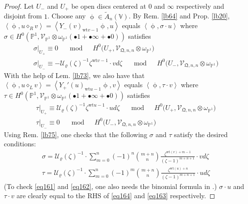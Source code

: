 \documentclass[11pt,b5paper,notitlepage]{article}
\theoremstyle{definition}
\theoremstyle{plain}
\newcommand{\mc}{\mathcal}
\newcommand{\wtd}{\widetilde}
\newcommand{\scr}{\mathscr}
\newcommand{\blt}{\bullet}
\newcommand{\Vbb}{\mathbb V}
\newcommand{\Pbb}{\mathbb P}
\newcommand{\wt}{\mathrm{wt}}
\newcommand{\<}{\left\langle}
\renewcommand{\>}{\right\rangle}
\newcommand{\fq}{{\mathfrak Q}}
\numberwithin{equation}{section}
\begin{document}
\begin{proof}
Let $U_-$ and $U_+$ be open discs centered at $0$ and $\infty$ respectively and disjoint from $1$. Choose any $\upphi\in\wtd A_n(\Vbb)$. By Rem. \ref{lb64} and Prop. \ref{lb20}, $\<\upphi,u\diamond_R v\>=\<Y_-(v)_{\wt v-1}\upphi,u\>$ equals $\<\upphi,\sigma\cdot u\>$ where $\sigma\in H^0(\Pbb^1,\scr V_{\Pbb^1}\otimes\omega_{\Pbb^1}(\blt 1+\blt\infty+\blt 0))$ satisfies
\begin{subequations}
\begin{gather}
\sigma\big|_{U_+}\equiv 0\quad\mod\quad H^0\big(U_+,\scr V_{\fq,n,n}\otimes\omega_{\Pbb^1}\big)\\
\sigma\big|_{U_-}\equiv -\mc U_\varrho(\zeta)^{-1} \zeta^{\wt v-1}\cdot  v d\zeta\quad\mod\quad H^0\big(U_-,\scr V_{\fq,n,n}\otimes\omega_{\Pbb^1}\big)  \label{eq161}
\end{gather}
\end{subequations}
With the help of Lem. \ref{lb73}, we also have that $\<\upphi,u\diamond_L v\>=\<Y_+'(u)_{\wt u-1}\upphi,v\>$ equals $\<\upphi,\tau\cdot v\>$ where $\tau\in H^0(\Pbb^1,\scr V_{\Pbb^1}\otimes\omega_{\Pbb^1}(\blt 1+\blt \infty+\blt 0))$ satisfies
\begin{subequations}
\begin{gather}
\tau\big|_{U_+}\equiv \mc U_\varrho(\zeta)^{-1} \zeta^{\wt u-1}\cdot u   d\zeta\quad\mod\quad H^0\big(U_+,\scr V_{\fq,n,n}\otimes\omega_{\Pbb^1}\big)  \label{eq162}\\
\tau\big|_{U_-}\equiv 0\quad\mod\quad H^0\big(U_-,\scr V_{\fq,n,n}\otimes\omega_{\Pbb^1}\big)
\end{gather}
\end{subequations}
Using Rem. \ref{lb75}, one checks that the following $\sigma$ and $\tau$ satisfy the desired conditions:
\begin{subequations}
\begin{gather}
\sigma=\mc U_\varrho(\zeta)^{-1}\cdot \sum_{m=0}^n(-1)^n \binom{m+n}{n}\frac{\zeta^{\wt(v)+m-1}}{(\zeta-1)^{m+n+1}} \cdot vd\zeta\\
\tau=\mc U_\varrho(\zeta)^{-1}\cdot \sum_{m=0}^n (-1)^m \binom{m+n}{n}\frac{\zeta^{\wt(u)+n}}{(\zeta-1)^{m+n+1}}\cdot ud\zeta
\end{gather}
\end{subequations}
(To check \eqref{eq161} and \eqref{eq162}, one also needs the binomial formula in \cite[Prop. 5.2]{DLM-Zhu}.) $\sigma\cdot u$ and $\tau\cdot v$ are clearly equal to the RHS of \eqref{eq164} and \eqref{eq163} respectively.
\end{proof}
\end{document}
